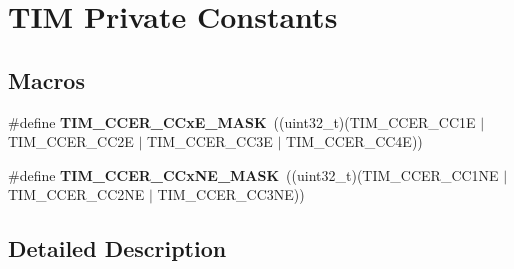 \hypertarget{group___t_i_m___private___constants}{}\section{T\+IM Private Constants}
\label{group___t_i_m___private___constants}
\subsection*{Macros}
\begin{DoxyCompactItemize}
\item 
\mbox{\label{group___t_i_m___private___constants_ga5d1a1d755cda12637dfa5143130b4891}} 
\#define {\bfseries T\+I\+M\+\_\+\+C\+C\+E\+R\+\_\+\+C\+Cx\+E\+\_\+\+M\+A\+SK}~((uint32\+\_\+t)(T\+I\+M\+\_\+\+C\+C\+E\+R\+\_\+\+C\+C1E $\vert$ T\+I\+M\+\_\+\+C\+C\+E\+R\+\_\+\+C\+C2E $\vert$ T\+I\+M\+\_\+\+C\+C\+E\+R\+\_\+\+C\+C3E $\vert$ T\+I\+M\+\_\+\+C\+C\+E\+R\+\_\+\+C\+C4E))
\item 
\mbox{\label{group___t_i_m___private___constants_gaeae61652a005098f9fe6b398d29d4279}} 
\#define {\bfseries T\+I\+M\+\_\+\+C\+C\+E\+R\+\_\+\+C\+Cx\+N\+E\+\_\+\+M\+A\+SK}~((uint32\+\_\+t)(T\+I\+M\+\_\+\+C\+C\+E\+R\+\_\+\+C\+C1\+NE $\vert$ T\+I\+M\+\_\+\+C\+C\+E\+R\+\_\+\+C\+C2\+NE $\vert$ T\+I\+M\+\_\+\+C\+C\+E\+R\+\_\+\+C\+C3\+NE))
\end{DoxyCompactItemize}


\subsection{Detailed Description}
